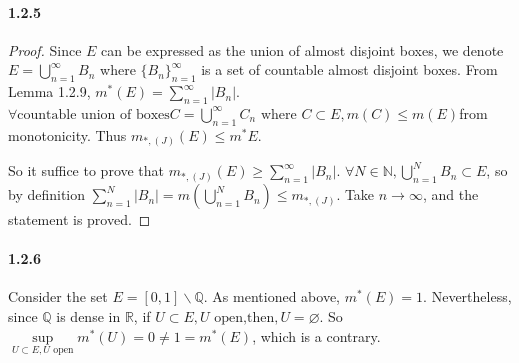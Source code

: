 \documentclass{article}
\begin{document}
\paragraph{1.2.5}
\begin{proof}
Since $E$ can be expressed as the union of almost disjoint boxes, we denote $E=\bigcup\limits_{n=1}^{\infty}B_n$ where $\{B_n\}_{n=1}^{\infty}$ is a set of countable almost disjoint boxes. From Lemma 1.2.9, $m^*(E)=\sum_{n=1}^{\infty}|B_n|$. $\forall \text{countable union of boxes} C=\bigcup\limits_{n=1}^{\infty}C_n \text{ where }C\subset E, m(C)\leq m(E) $from monotonicity. Thus $m_{*,(J)}(E)\leq m^*{E}$.

So it suffice to prove that $m_{*,(J)}(E)\geq \sum\limits_{n=1}^{\infty}|B_n|$. $\forall N\in\mathbb{N}, \bigcup\limits_{n=1}^{N}B_n\subset E$, so by definition $\sum\limits_{n=1}^{N}|B_n|=m(\bigcup\limits_{n=1}^{N}B_n)\leq m_{*,(J)}$. Take $n\to\infty$, and the statement is proved.







\end{proof}

\paragraph{1.2.6}
Consider the set $E=[0,1]\backslash \mathbb{Q}$. As mentioned above, $m^*(E)=1$. Nevertheless, since $\mathbb{Q}$
is dense in $\mathbb{R}$, if $U\subset E, U\text{ open,then}, U=\varnothing$. So $\sup\limits_{U\subset E, U\text{ open}}m^*(U)=0\neq 1=m^*(E)$, which is a contrary.  
\end{document}
